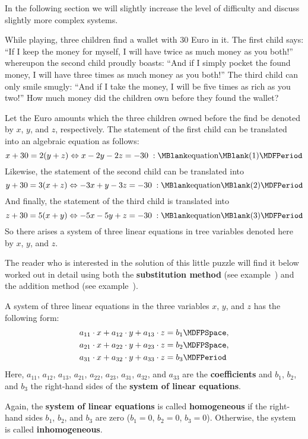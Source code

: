 \begin{MIntro}
In the following section we will slightly increase the level of difficulty and 
discuss slightly more complex systems.

\begin{MExample}
While playing, three children find a wallet with $30$ Euro in it. The first child says: 
``If I keep the money for myself, I will have twice as much money as you both!''  whereupon the 
second child proudly boasts: ``And if I simply pocket the found money, I will have three 
times as much money as you both!'' The third child can only smile smugly: ``And if I take the 
money, I will be five times as rich as you two!'' How much money did the children
own before they found the wallet?

Let the Euro amounts which the three children owned before the find be denoted by 
$x$, $y$, and $z$, respectively. The statement of the first child can be translated into
an algebraic equation as follows:
$$x + 30 = 2 (y + z) \Leftrightarrow x - 2 y - 2 z = - 30 \; : \MBlank\mbox{equation}\MBlank (1) \MDFPeriod$$
Likewise, the statement of the second child can be translated into
$$y + 30 = 3 (x + z) \Leftrightarrow - 3 x + y - 3 z = - 30 \; : \MBlank\mbox{equation}\MBlank (2) \MDFPeriod$$
And finally, the statement of the third child is translated into
$$z + 30 = 5 (x + y) \Leftrightarrow - 5 x - 5 y + z = - 30 \; : \MBlank\mbox{equation}\MBlank (3) \MDFPeriod$$
So there arises a system of three linear equations in tree variables denoted here by $x$, $y$, and $z$. 
\end{MExample}
The reader who is interested in the solution of this little puzzle will find it below 
worked out in detail using both the \textbf{substitution method} 
(see example~) and the addition method (see example~).
\begin{MInfo}
A system of three linear equations in the three variables $x$, $y$, and $z$ has
the following form:
\begin{eqnarray*}
a_{11} \cdot x + a_{12} \cdot y + a_{13} \cdot z & = b_1 \MDFPSpace, \\
a_{21} \cdot x + a_{22} \cdot y + a_{23} \cdot z & = b_2 \MDFPSpace, \\
a_{31} \cdot x + a_{32} \cdot y + a_{33} \cdot z & = b_3 \MDFPeriod
\end{eqnarray*}
Here, $a_{11}$, $a_{12}$, $a_{13}$, $a_{21}$, $a_{22}$, $a_{23}$, $a_{31}$, $a_{32}$, and $a_{33}$
are the \textbf{coefficients} and $b_1$, $b_2$, and $b_3$ the right-hand sides
of the \textbf{system of linear equations}.

Again, the \textbf{system of linear equations} is called \textbf{homogeneous} if 
the right-hand sides $b_1$, $b_2$, and $b_3$ are zero ($b_1 = 0$, $b_2 = 0$, $b_3 = 0$). 
Otherwise, the system is called \textbf{inhomogeneous}.
\end{MInfo}
\end{MIntro}

